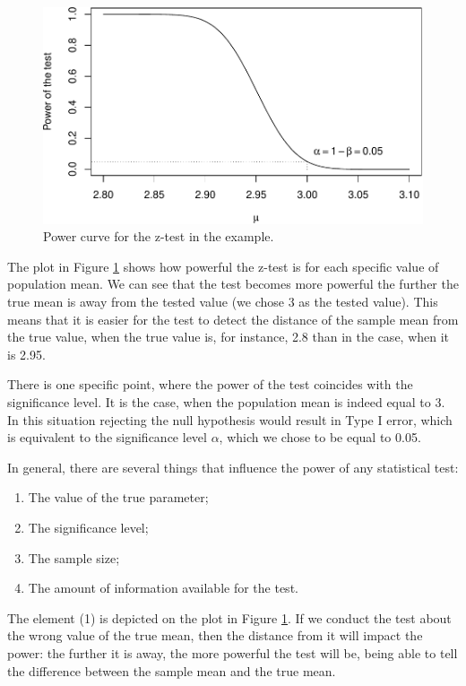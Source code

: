 \documentclass[
]{book}
\providecommand{\tightlist}{%
  \setlength{\itemsep}{0pt}\setlength{\parskip}{0pt}}
\theoremstyle{definition}
\theoremstyle{definition}
\theoremstyle{definition}
\theoremstyle{definition}
\theoremstyle{remark}
\begin{document}
\begin{figure}
\centering
\includegraphics{Svetunkov---Statistics-for-Business-Analytics_files/figure-latex/powerCurve-1.pdf}
\caption{\label{fig:powerCurve}Power curve for the z-test in the example.}
\end{figure}

The plot in Figure \ref{fig:powerCurve} shows how powerful the z-test is for each specific value of population mean. We can see that the test becomes more powerful the further the true mean is away from the tested value (we chose 3 as the tested value). This means that it is easier for the test to detect the distance of the sample mean from the true value, when the true value is, for instance, 2.8 than in the case, when it is 2.95.

There is one specific point, where the power of the test coincides with the significance level. It is the case, when the population mean is indeed equal to 3. In this situation rejecting the null hypothesis would result in Type I error, which is equivalent to the significance level \(\alpha\), which we chose to be equal to 0.05.

In general, there are several things that influence the power of any statistical test:

\begin{enumerate}
\def\labelenumi{\arabic{enumi}.}
\tightlist
\item
  The value of the true parameter;
\item
  The significance level;
\item
  The sample size;
\item
  The amount of information available for the test.
\end{enumerate}

The element (1) is depicted on the plot in Figure \ref{fig:powerCurve}. If we conduct the test about the wrong value of the true mean, then the distance from it will impact the power: the further it is away, the more powerful the test will be, being able to tell the difference between the sample mean and the true mean.
\end{document}
